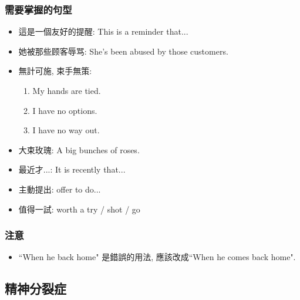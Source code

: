\subsubsection*{需要掌握的句型}
\begin{multicols}{2}
\begin{itemize}
  \itemsep0em
  \item 這是一個友好的提醒: This is a  reminder that...
  \item 她被那些顾客辱骂: She's been abused by those customers.
  \item 無計可施, 束手無策:
  \begin{enumerate}
    \itemsep0em
    \item My hands are tied.
    \item I have no options.
    \item I have no way out.
  \end{enumerate}
  \item 大束玫瑰: A big bunches of roses.
  \item 最近才...: It is  recently that...
  \item 主動提出: offer to do...
  \item 值得一試: worth a try / shot / go
\end{itemize}
\end{multicols}

\subsubsection*{注意}
\begin{itemize}
  \item ``When he back home" 是錯誤的用法, 應該改成``When he comes back home".
\end{itemize}

\subsection{精神分裂症}
